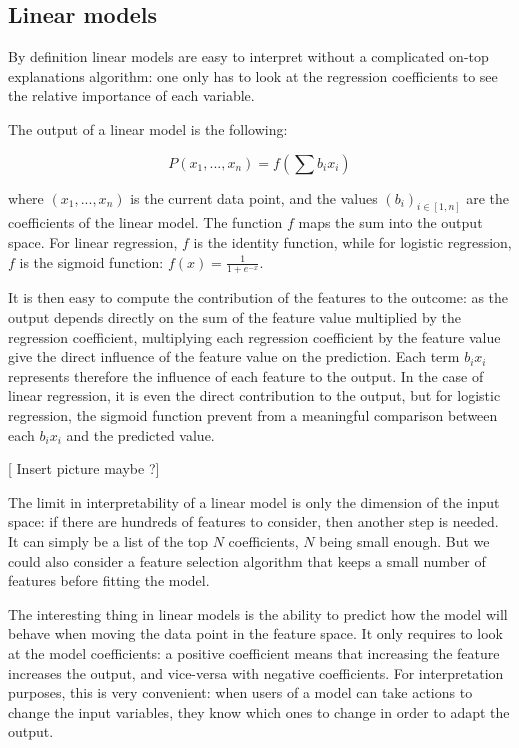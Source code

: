 \documentclass[a4paper,11pt]{kth-mag}
\begin{document}
\subsection{Linear models}

By definition linear models are easy to interpret without a complicated on-top explanations algorithm: one only has to look at the regression coefficients to see the relative importance of each variable.

The output of a linear model is the following:

\[
	P(x_1, ..., x_n) = f \left( \sum b_i x_i \right)
\]

where $(x_1, ..., x_n)$ is the current data point, and the values $(b_i)_{i \in [1, n]}$ are the coefficients of the linear model. The function $f$ maps the sum into the output space. For linear regression, $f$ is the identity function, while for logistic regression, $f$ is the sigmoid function: $f(x) = \frac1{1 + e^{-x}}$.

It is then easy to compute the contribution of the features to the outcome: as the output depends directly on the sum of the feature value multiplied by the regression coefficient, multiplying each regression coefficient by the feature value give the direct influence of the feature value on the prediction. Each term $b_i x_i$ represents therefore the influence of each feature to the output. In the case of linear regression, it is even the direct contribution to the output, but for logistic regression, the sigmoid function prevent from a meaningful comparison between each $b_i x_i$ and the predicted value.

\begin{center}
	[ Insert picture maybe ?]
\end{center}

The limit in interpretability of a linear model is only the dimension of the input space: if there are hundreds of features to consider, then another step is needed. It can simply be a list of the top $N$ coefficients, $N$ being small enough. But we could also consider a feature selection algorithm that keeps a small number of features before fitting the model.

The interesting thing in linear models is the ability to predict how the model will behave when moving the data point in the feature space. It only requires to look at the model coefficients: a positive coefficient means that increasing the feature increases the output, and vice-versa with negative coefficients. For interpretation purposes, this is very convenient: when users of a model can take actions to change the input variables, they know which ones to change in order to adapt the output.
\end{document}
